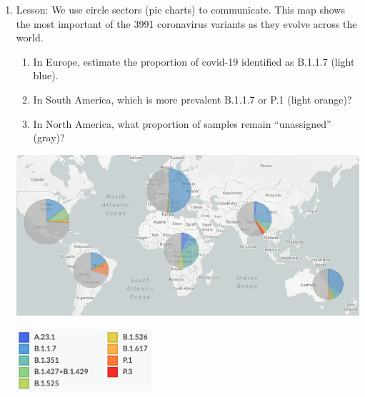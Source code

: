 \documentclass[12pt, twoside]{article}
\begin{document}
\begin{enumerate}
\newpage
\item Lesson: We use circle sectors (pie charts) to communicate. This map shows the most important of the 3991 coronavirus variants as they evolve across the world.
\begin{enumerate}[itemsep=0.7cm]
  \item In Europe, estimate the proportion of covid-19 identified as B.1.1.7 (light blue).
  \item In South America, which is more prevalent B.1.1.7 or P.1 (light orange)?
  \item In North America, what proportion of samples remain ``unassigned'' (gray)?
\end{enumerate}
  \begin{center}
    \includegraphics[width=18cm]{8-3Covid_map.png}
  \end{center}
  \begin{flushright}
    \includegraphics[width=5cm]{8-3Covid_map_legend.png}
  \end{flushright}


\end{enumerate}
\end{document}
